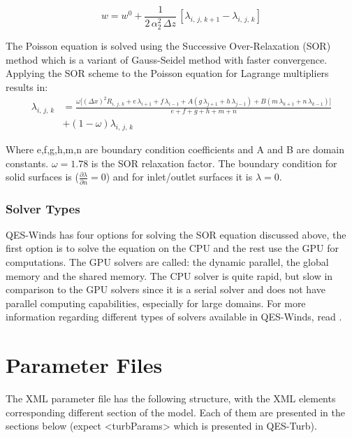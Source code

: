 \begin{equation}
\label{eu-lag3}
 w = w^0 + \frac{1}{2\,\alpha_2^2\,\Delta z}\,[\lambda_{i,\,j,\,k+1}-\lambda_{i,\,j,\,k}]
\end{equation}

The Poisson equation is solved using the Successive Over-Relaxation (SOR) method which is a variant of Gauss-Seidel method with faster convergence. Applying the SOR scheme to the Poisson equation for Lagrange multipliers results in:
\begin{equation}
\label{SOR}
\begin{split}
 \lambda_{i,\,j,\,k} & = \frac{\omega\Bigg[(\Delta x)^2 R_{i,\,j,\,k}+e\,\lambda_{i+1}+f\, \lambda_{i-1}+A(g\,\lambda_{j+1}+h\, \lambda_{j-1}) + B(m\,\lambda_{k+1}+n\, \lambda_{k-1})\Bigg]}{e+f+g+h+m+n}\\
 & +(1-\omega)\lambda_{i,\,j,\,k}
 \end{split}
\end{equation}

Where e,f,g,h,m,n are boundary condition coefficients and A and B are domain constants. $\omega = 1.78$ is the SOR relaxation factor. The boundary condition for solid surfaces is ($\frac{\partial \lambda}{\partial n}=0$) and for inlet/outlet surfaces it is $\lambda=0$.


\subsubsection{Solver Types}

QES-Winds has four options for solving the SOR equation discussed above, the first option is to solve the equation on the CPU and the rest use the GPU for computations. The GPU solvers are called: the dynamic parallel, the global memory and the shared memory. The CPU solver is quite rapid, but slow in comparison to the GPU solvers since it is a serial solver and does not have parallel computing capabilities, especially for large domains. For more information regarding different types of solvers available in QES-Winds, read \cite{Bozorgmehr2021}.

\section{Parameter Files}

The XML parameter file has the following structure, with the XML elements corresponding different section of the model. Each of them are presented in the sections below (expect <turbParams> which is presented in QES-Turb).

